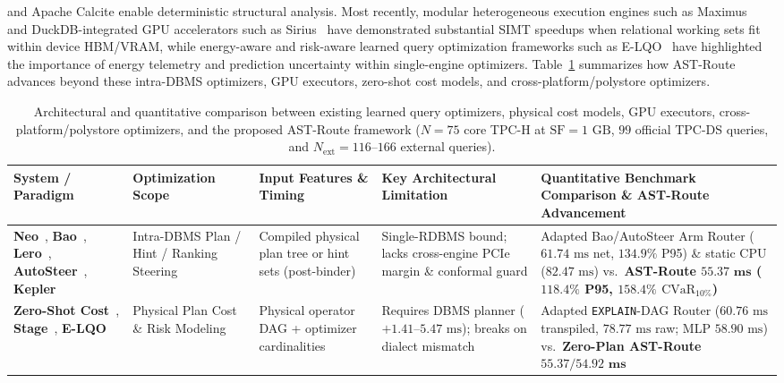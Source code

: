 \documentclass[10pt,a4paper]{article}
\newenvironment{fitasttable}{%
  \begin{lrbox}{\asttblbox}%
}{%
  \end{lrbox}%
  \sbox{\asttblboxB}{%
    \ifdim\wd\asttblbox>0.96\textwidth
      \resizebox{0.96\textwidth}{!}{\usebox{\asttblbox}}%
    \else
      \usebox{\asttblbox}%
    \fi
  }%
  \ifdim\ht\asttblboxB>0.72\textheight
    \resizebox{!}{0.72\textheight}{\usebox{\asttblboxB}}%
  \else
    \usebox{\asttblboxB}%
  \fi
}
\begin{document}
\cite{mao2024sqlglot} and Apache Calcite \cite{begoli2018calcite} enable deterministic structural analysis. Most recently, modular heterogeneous execution engines such as Maximus~\cite{kabic2025maximus} and DuckDB-integrated GPU accelerators such as Sirius~\cite{yogatama2025sirius} have demonstrated substantial SIMT speedups when relational working sets fit within device HBM/VRAM, while energy-aware and risk-aware learned query optimization frameworks such as E-LQO~\cite{liang2026elqo} have highlighted the importance of energy telemetry and prediction uncertainty within single-engine optimizers. Table~\ref{tab:related_work_comparison} summarizes how AST-Route advances beyond these intra-DBMS optimizers, GPU executors, zero-shot cost models, and cross-platform/polystore optimizers.

\begin{table}[!t]
\centering
\begingroup
\providecommand{\theHtable}{}
\renewcommand{\theHtable}{2A}
\caption{Architectural and quantitative comparison between existing learned query optimizers, physical cost models, GPU executors, cross-platform/polystore optimizers, and the proposed AST-Route framework ($N=75$ core TPC-H at $\text{SF}=1\text{ GB}$, $99$ official TPC-DS queries, and $N_{\text{ext}}=116\text{--}166$ external queries).}\label{tab:jbd_related_2a}
\label{tab:related_work_comparison}
\scriptsize
\setlength{\tabcolsep}{3.0pt}
\renewcommand{\arraystretch}{1.15}
\begin{fitasttable}
\begin{tabular}{@{}p{2.6cm}p{2.2cm}p{2.7cm}p{3.9cm}p{4.6cm}@{}}
\toprule
\textbf{System / Paradigm} & \textbf{Optimization Scope} & \textbf{Input Features \& Timing} & \textbf{Key Architectural Limitation} & \textbf{Quantitative Benchmark Comparison \& AST-Route Advancement} \\
\midrule
\textbf{Neo}~\cite{marcus2019neo}, \textbf{Bao}~\cite{marcus2021bao}, \textbf{Lero}~\cite{zhu2023lero}, \textbf{AutoSteer}~\cite{anneser2023autosteer}, \textbf{Kepler}~\cite{doshi2023kepler} & Intra-DBMS Plan / Hint / Ranking Steering & Compiled physical plan tree or hint sets (post-binder) & Single-RDBMS bound; lacks cross-engine PCIe margin \& conformal guard & Adapted Bao/AutoSteer Arm Router ($61.74\text{ ms}$ net, $134.9\%$ P95) \& static CPU ($82.47\text{ ms}$) vs.\ \textbf{AST-Route $\mathbf{55.37\text{ ms}}$ ($\mathbf{118.4\%}$ P95, $\mathbf{158.4\%}$ $\text{CVaR}_{10\%}$)} \\
\textbf{Zero-Shot Cost}~\cite{hilprecht2022zeroshot}, \textbf{Stage}~\cite{nathan2024stage}, \textbf{E-LQO}~\cite{liang2026elqo} & Physical Plan Cost \& Risk Modeling & Physical operator DAG + optimizer cardinalities & Requires DBMS planner ($+1.41\text{--}5.47\text{ ms}$); breaks on dialect mismatch & Adapted \texttt{EXPLAIN}-DAG Router ($60.76\text{ ms}$ transpiled, $78.77\text{ ms}$ raw; MLP $58.90\text{ ms}$) vs.\ \textbf{Zero-Plan AST-Route $\mathbf{55.37 / 54.92\text{ ms}}$} \\

\end{tabular}
\end{fitasttable}
\end{table}
\end{document}
